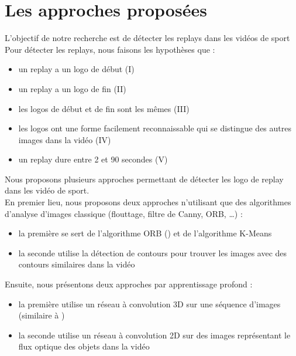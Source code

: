 \documentclass[11pt]{article}
\begin{document}
\newpage
\section{Les approches proposées}
\label{sec:org453392b}
L'objectif de notre recherche est de détecter les replays dans les vidéos de sport\\

Pour détecter les replays, nous faisons les hypothèses que :\\
\begin{itemize}
\item un replay a un logo de début (I)\\
\item un replay a un logo de fin (II)\\
\item les logos de début et de fin sont les mêmes (III)\\
\item les logos ont une forme facilement reconnaissable qui se distingue des  autres images dans la vidéo (IV)\\
\item un replay dure entre 2 et 90 secondes (V)\\
\end{itemize}

Nous proposons plusieurs approches permettant de détecter les logo de replay dans les vidéo de sport.\\
En premier lieu, nous proposons deux approches n'utilisant que des algorithmes d'analyse d'images classique (flouttage, filtre de Canny, ORB, \ldots{}) :\\
\begin{itemize}
\item la première se sert de l'algorithme ORB (\cite{Rublee_2011}) et de l'algorithme K-Means\\
\item la seconde utilise la détection de contours pour trouver les images avec des contours similaires dans la vidéo\\
\end{itemize}
Ensuite, nous présentons deux approches par apprentissage profond :\\
\begin{itemize}
\item la première utilise un réseau à convolution 3D sur une séquence d'images (similaire à \cite{Tran_2015})\\
\item la seconde utilise un réseau à convolution 2D sur des images représentant le flux optique des objets dans la vidéo\\
\end{itemize}
\end{document}
